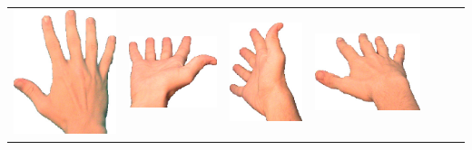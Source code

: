 \documentclass{article}
\begin{document}
\begin{center}
\begin{tabular}{r*{6}{c}}
\includegraphics[scale=0.1]{images/05-01-3.jpg}&
\includegraphics[scale=0.1]{images/05-01-4.jpg}&
\includegraphics[scale=0.1]{images/05-01-5.jpg}&
\includegraphics[scale=0.1]{images/05-01-6.jpg}\\

\end{tabular}
\end{center}
\end{document}
